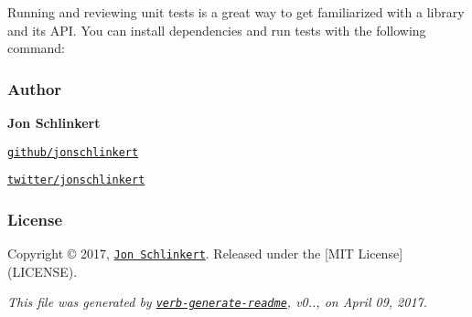 Running and reviewing unit tests is a great way to get familiarized with a library and its A\+PI. You can install dependencies and run tests with the following command\+:




\subsubsection*{Author}

{\bfseries Jon Schlinkert}


\begin{DoxyItemize}
\item \href{https://github.com/jonschlinkert}{\tt github/jonschlinkert}
\item \href{https://twitter.com/jonschlinkert}{\tt twitter/jonschlinkert}
\end{DoxyItemize}

\subsubsection*{License}

Copyright © 2017, \href{https://github.com/jonschlinkert}{\tt Jon Schlinkert}. Released under the \mbox{[}M\+IT License\mbox{]}(L\+I\+C\+E\+N\+SE).





{\itshape This file was generated by \href{https://github.com/verbose/verb-generate-readme}{\tt verb-\/generate-\/readme}, v0.., on April 09, 2017.} 